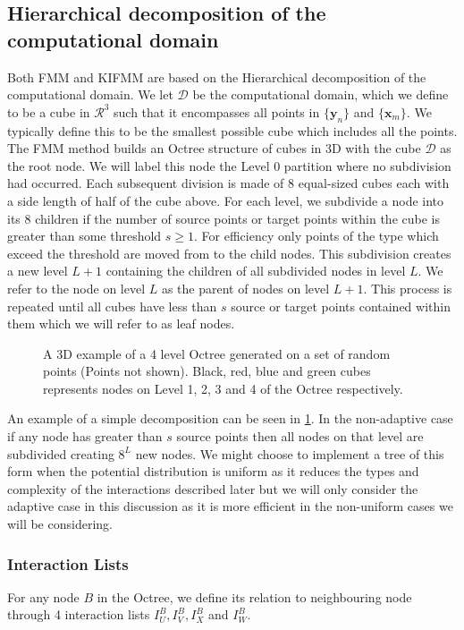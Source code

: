 \subsection{Hierarchical decomposition of the computational domain}
Both FMM and KIFMM are based on the Hierarchical decomposition of the computational domain. We let $\mathcal{D}$ be the computational domain, which we define to be a cube in $\mathcal{R}^3$ such that it encompasses all points in $\{\bm{y}_n\}$ and $\{\bm{x}_m\}$. We typically define this to be the smallest possible cube which includes all the points. The FMM method builds an Octree structure of cubes in 3D with the cube $\mathcal{D}$ as the root node. We will label this node the Level $0$ partition where no subdivision had occurred. Each subsequent division is made of $8$ equal-sized cubes each with a side length of half of the cube above. For each level, we subdivide a node into its $8$ children if the number of source points or target points within the cube is greater than some threshold $s\geq 1$. For efficiency only points of the type which exceed the threshold are moved from to the child nodes. This subdivision creates a new level $L+1$ containing the children of all subdivided nodes in level $L$. We refer to the node on level $L$ as the parent of nodes on level $L+1$. This process is repeated until all cubes have less than $s$ source or target points contained within them which we will refer to as leaf nodes.

\begin{figure}[ht]
    \centering
    \resizebox{.6\linewidth}{!}{}
    \caption{A 3D example of a 4 level Octree generated on a set of random points (Points not shown). Black, red, blue and green cubes represents nodes on Level 1, 2, 3 and 4 of the Octree respectively.}
    \label{fig:Decompostionexample}
\end{figure}

An example of a simple decomposition can be seen in \cref{fig:Decompostionexample}. In the non-adaptive case if any node has greater than $s$ source points then all nodes on that level are subdivided creating $8^L$ new nodes. We might choose to implement a tree of this form when the potential distribution is uniform as it reduces the types and complexity of the interactions described later but we will only consider the adaptive case in this discussion as it is more efficient in the non-uniform cases we will be considering.

\subsubsection{Interaction Lists}
For any node $B$ in the Octree, we define its relation to neighbouring node through 4 interaction lists $I_U^B, I_V^B, I_X^B$ and $I_W^B$. 

